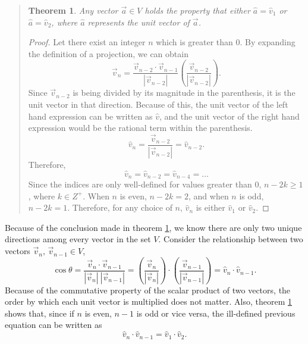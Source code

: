 \documentclass{article}
\newtheorem{theorem}{Theorem}
\begin{document}
\begin{quote}
\begin{theorem} \label{thm:first}
Any vector $\vec{a}\in V$ holds the property that either $\hat{a}=\hat{v}_1$ or $\hat{a}=\hat{v}_2$, where $\hat{a}$ represents the unit vector of $\vec{a}$.
\end{theorem}

\begin{proof}
Let there exist an integer $n$ which is greater than 0. By expanding the definition of a projection, we can obtain
\[
    \vec{v}_n=\frac{\vec{v}_{n-2}\cdot\vec{v}_{n-1}}{|\vec{v}_{n-2}|}\left(\frac{\vec{v}_{n-2}}{|\vec{v}_{n-2}|}\right).
\]
Since $\vec{v}_{n-2}$ is being divided by its magnitude in the parenthesis, it is the unit vector in that direction. Because of this, the unit vector of the left hand expression can be written as $\hat{v}$, and the unit vector of the right hand expression would be the rational term within the parenthesis.
\[
    \hat{v}_n=\frac{\vec{v}_{n-2}}{|\vec{v}_{n-2}|}=\hat{v}_{n-2}.
\]
Therefore,
\[
    \hat{v}_n=\hat{v}_{n-2}=\hat{v}_{n-4}=\dots
\]
Since the indices are only well-defined for values greater than $0$, $n-2k\geq1$, where $k\in Z^+$. When $n$ is even, $n-2k=2$, and when $n$ is odd, $n-2k=1$. Therefore, for any choice of $n$, $\hat{v}_n$ is either $\hat{v}_1$ or $\hat{v}_2$.

\end{proof}
\end{quote}

Because of the conclusion made in theorem \ref{thm:first}, we know there are only two unique directions among every vector in the set $V$. Consider the relationship between two vectors $\vec{v}_n,\, \vec{v}_{n-1} \in V$,
\begin{equation} \label{eq:cos}
    \cos\theta = \frac{ \vec{v}_n \cdot \vec{v}_{n-1} }{ |\vec{v}_n|\:|\vec{v}_{n-1}| } = \left(\frac{\vec{v}_n}{|\vec{v}_n|}\right) \cdot \left(\frac{\vec{v}_{n-1}}{|\vec{v}_{n-1}|}\right)=\hat{v}_n \cdot \hat{v}_{n-1}.
\end{equation}
Because of the commutative property of the scalar product of two vectors, the order by which each unit vector is multiplied does not matter. Also, theorem \ref{thm:first} shows that, since if $n$ is even, $n-1$ is odd or vice versa, the ill-defined previous equation can be written as
\begin{equation} \label{eq:dotprod1}
    \hat{v}_n \cdot \hat{v}_{n-1} = \hat{v}_1 \cdot \hat{v}_2.
\end{equation}
\end{document}
